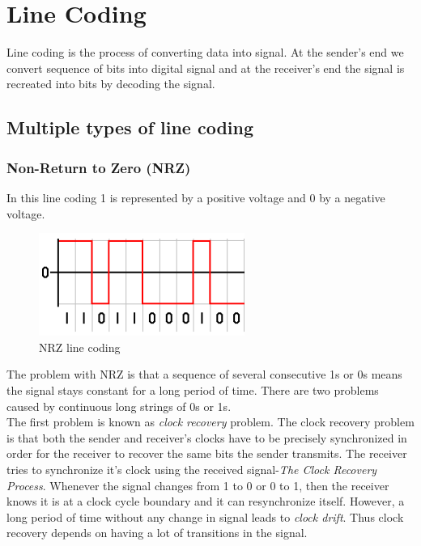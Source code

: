\section{Line Coding}
Line coding is the process of converting data into signal. At the sender's end we convert sequence of bits into digital signal and at the receiver's end the signal is recreated into bits by decoding the signal.

\subsection{Multiple types of line coding}
\subsubsection{Non-Return to Zero (NRZ)}
\label{NRZ}
In this line coding 1 is represented by a positive voltage and 0 by a negative voltage.

\begin{figure}[H]
    \centering
    \includegraphics[width=0.6\textwidth]{img/NRZ.png}
    \caption{NRZ line coding}
    \label{fig:NRZ}
\end{figure}

The problem with NRZ is that a sequence of several consecutive 1s or 0s means the signal stays constant for a long period of time. There are two problems caused by continuous long strings of 0s or 1s.\\

The first problem is known as \textit{clock recovery} problem. The clock recovery problem is that both the sender and receiver's clocks have to be precisely synchronized in order for the receiver to recover the same bits the sender transmits. The receiver tries to synchronize it's clock using the received signal-\textit{The Clock Recovery Process}. Whenever the signal changes from 1 to 0 or 0 to 1, then the receiver knows it is at a clock cycle boundary and it can resynchronize itself. However, a long period of time without any change in signal leads to \textit{clock drift}. Thus clock recovery depends on having a lot of transitions in the signal.\\

